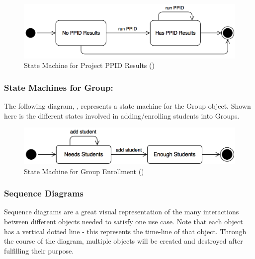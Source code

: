 \documentclass[12pt,letterpaper]{article}
\begin{document}
\begin{figure}[H]
	\centering{}
	\includegraphics[scale=0.3]{imgs/state/project-ppid-results.png}
	\caption[ - State Machine for Project PPID Results]{State Machine for Project PPID Results ()}
\end{figure}

\subsubsection*{State Machines for Group:}

The following diagram, , represents a state machine for the Group object. Shown here is the different states involved in adding/enrolling students into Groups.

\begin{figure}[H]
	\centering{}
	\includegraphics[scale=0.3]{imgs/state/group-enrollment.png}
	\caption[ - State Machine for Group Enrollment]{State Machine for Group Enrollment ()}
\end{figure}

\subsubsection*{Sequence Diagrams}

Sequence diagrams are a great visual representation of the many interactions between different objects needed to satisfy one use case. Note that
each object has a vertical dotted line - this represents the time-line of that object. Through the course of the diagram, multiple objects will be created
and destroyed after fulfilling their purpose.
\end{document}
